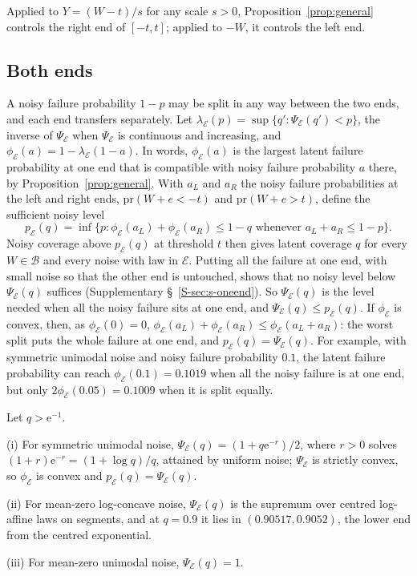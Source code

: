 \documentclass[lineno]{biometrika}
\newcommand{\pr}{\mathrm{pr}}
\begin{document}
Applied to $Y = (W - t)/s$ for any scale $s > 0$, Proposition~\ref{prop:general} controls the right end of $[-t, t]$; applied to $-W$, it controls the left end.

\subsection{Both ends}

A noisy failure probability $1 - p$ may be split in any way between the two ends, and each end transfers separately. Let $\lambda_{\mathcal E}(p) = \sup\{q' : \Psi_{\mathcal E}(q') < p\}$, the inverse of $\Psi_{\mathcal E}$ when $\Psi_{\mathcal E}$ is continuous and increasing, and $\phi_{\mathcal E}(a) = 1 - \lambda_{\mathcal E}(1 - a)$. In words, $\phi_{\mathcal E}(a)$ is the largest latent failure probability at one end that is compatible with noisy failure probability $a$ there, by Proposition~\ref{prop:general}. With $a_L$ and $a_R$ the noisy failure probabilities at the left and right ends, $\pr(W + e < -t)$ and $\pr(W + e > t)$, define the sufficient noisy level
\begin{equation}\label{eq:pE}
p_{\mathcal E}(q) = \inf\{p : \phi_{\mathcal E}(a_L) + \phi_{\mathcal E}(a_R) \le 1 - q \text{ whenever } a_L + a_R \le 1 - p\}.
\end{equation}
Noisy coverage above $p_{\mathcal E}(q)$ at threshold $t$ then gives latent coverage $q$ for every $W \in \mathcal B$ and every noise with law in $\mathcal E$. Putting all the failure at one end, with small noise so that the other end is untouched, shows that no noisy level below $\Psi_{\mathcal E}(q)$ suffices (Supplementary \S~\ref{S-sec:s-oneend}). So $\Psi_{\mathcal E}(q)$ is the level needed when all the noisy failure sits at one end, and $\Psi_{\mathcal E}(q) \le p_{\mathcal E}(q)$. If $\phi_{\mathcal E}$ is convex, then, as $\phi_{\mathcal E}(0) = 0$, $\phi_{\mathcal E}(a_L) + \phi_{\mathcal E}(a_R) \le \phi_{\mathcal E}(a_L + a_R)$: the worst split puts the whole failure at one end, and $p_{\mathcal E}(q) = \Psi_{\mathcal E}(q)$. For example, with symmetric unimodal noise and noisy failure probability $0.1$, the latent failure probability can reach $\phi_{\mathcal E}(0.1) = 0.1019$ when all the noisy failure is at one end, but only $2\phi_{\mathcal E}(0.05) = 0.1009$ when it is split equally.

\begin{theorem}\label{thm:classes}
Let $q > \mathrm{e}^{-1}$.
\par\noindent (i) For symmetric unimodal noise, $\Psi_{\mathcal E}(q) = (1 + q \mathrm{e}^{-r})/2$, where $r > 0$ solves $(1 + r)\mathrm{e}^{-r} = (1 + \log q)/q$, attained by uniform noise; $\Psi_{\mathcal E}$ is strictly convex, so $\phi_{\mathcal E}$ is convex and $p_{\mathcal E}(q) = \Psi_{\mathcal E}(q)$.
\par\noindent (ii) For mean-zero log-concave noise, $\Psi_{\mathcal E}(q)$ is the supremum over centred log-affine laws on segments, and at $q = 0.9$ it lies in $(0.90517, 0.9052)$, the lower end from the centred exponential.
\par\noindent (iii) For mean-zero unimodal noise, $\Psi_{\mathcal E}(q) = 1$.
\end{theorem}
\end{document}

